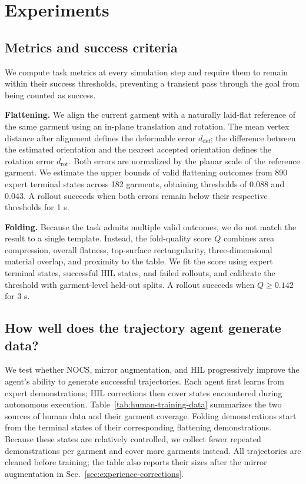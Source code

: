 \section{Experiments}
\label{sec:experiments}

\subsection{Metrics and success criteria}
\label{sec:success-criteria}

We compute task metrics at every simulation step and require them to remain
within their success thresholds, preventing a transient pass through the goal
from being counted as success.

\textbf{Flattening.} We align the current garment with a naturally laid-flat
reference of the same garment using an in-plane translation and rotation. The
mean vertex distance after alignment defines the deformable error
$d_{\mathrm{def}}$; the difference between the estimated orientation and the
nearest accepted orientation defines the rotation error $d_{\mathrm{rot}}$.
Both errors are normalized by the planar scale of the reference garment. We
estimate the upper bounds of valid flattening outcomes from 890 expert terminal
states across 182 garments, obtaining thresholds of 0.088 and 0.043. A rollout
succeeds when both errors remain below their respective thresholds for 1 s.

\textbf{Folding.} Because the task admits multiple valid outcomes, we do not
match the result to a single template. Instead, the fold-quality score $Q$
combines area compression, overall flatness, top-surface rectangularity,
three-dimensional material overlap, and proximity to the table. We fit the
score using expert terminal states, successful HIL states, and failed rollouts,
and calibrate the threshold with garment-level held-out splits. A rollout
succeeds when $Q\geq0.142$ for 3 s.

\subsection{How well does the trajectory agent generate data?}
\label{sec:trajectory-agent-eval}

We test whether NOCS, mirror augmentation, and HIL progressively improve the
agent's ability to generate successful trajectories. Each agent first learns
from expert demonstrations; HIL corrections then cover states encountered
during autonomous execution. Table~\ref{tab:human-training-data} summarizes the
two sources of human data and their garment coverage. Folding demonstrations
start from the terminal states of their corresponding flattening
demonstrations. Because these states are relatively controlled, we collect
fewer repeated demonstrations per garment and cover more garments instead.
All trajectories are cleaned before training; the table also reports their
sizes after the mirror augmentation in Sec.~\ref{sec:experience-corrections}.

